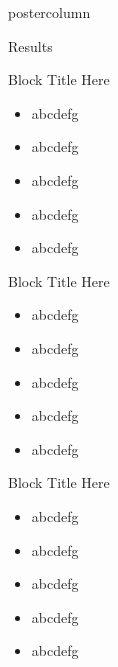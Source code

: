 \documentclass[final]{beamer}
\begin{document}
\begin{frame}
\begin{columns}
\begin{column}{0.32\textwidth}
\begin{beamercolorbox}[center,wd=\textwidth]{postercolumn}
\begin{minipage}[T]{.95\textwidth}
{\begin{block}{Results}
  \end{block}
  
  
  
  \begin{block}{Block Title Here}
  	\begin{itemize}
  	\item abcdefg
  	\item abcdefg
  	\item abcdefg
  	\item abcdefg
  	\item abcdefg
  	\end{itemize}
  \end{block}
  
  
  \begin{block}{Block Title Here}
  	\begin{itemize}
  	\item abcdefg
  	\item abcdefg
  	\item abcdefg
  	\item abcdefg
  	\item abcdefg
  	\end{itemize}
  \end{block}
  
  
  
  \begin{block}{Block Title Here}
  	\begin{itemize}
  	\item abcdefg
  	\item abcdefg
  	\item abcdefg
  	\item abcdefg
  	\item abcdefg
  	\end{itemize}
  \end{block}






}
\end{minipage}
\end{beamercolorbox}
\end{column}




\end{columns}
\end{frame}
\end{document}
